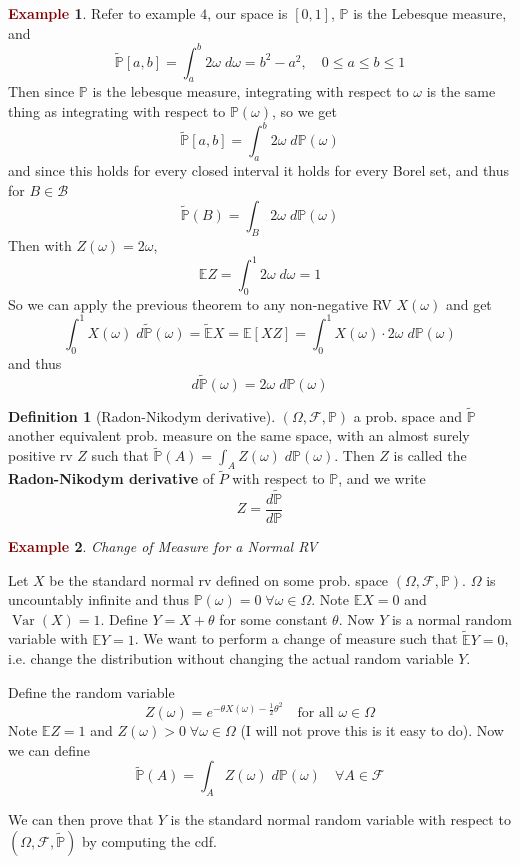 \documentclass[11pt]{article}
\theoremstyle{definition}
\theoremstyle{definition}
\theoremstyle{definition}
\newtheorem{definition}{\textcolor{OliveGreen}{Definition}}
\newtheorem{ex}{\textcolor{Maroon}{Example}}
\theoremstyle{remark}
\begin{document}
\begin{ex}
    Refer to example $4$, our space is $[0, 1]$, $\mathbb{P}$ is the Lebesque measure, and  
    \[
        \tilde{\mathbb{P}}[a,b] = \int_a^b 2 \omega \; d \omega = b^2 - a^2, \quad 0 \leq a \leq b \leq 1
    \] 
    Then since $\mathbb{P}$ is the lebesque measure, integrating with respect to $\omega$ is the same thing as 
    integrating with respect to $\mathbb{P}(\omega)$, so we get
    \[
        \tilde{\mathbb{P}}[a, b] = \int_a^b 2 \omega \; d\mathbb{P}(\omega)
    \]   
    and since this holds for every closed interval it holds for every Borel set, and thus for $B \in \mathcal{B}$ 
    \[
        \tilde{\mathbb{P}}(B) = \int_B 2 \omega \; d\mathbb{P}(\omega)
    \] 
    Then with $Z(\omega) = 2 \omega$, 
    \[
        \mathbb{E} Z = \int_0^1 2 \omega \; d \omega = 1
    \] 
    So we can apply the previous theorem to any non-negative RV $X(\omega)$ and get
    \[
        \int_0^1 X(\omega) \; d \tilde{\mathbb{P}}(\omega) = \tilde{\mathbb{E}} X = \mathbb{E} [XZ] = \int_0^1 X(\omega) \cdot 2 \omega \; d\mathbb{P}(\omega)
    \] 
    and thus
    \[
        d\tilde{\mathbb{P}}(\omega) = 2 \omega \; d \mathbb{P}(\omega)
    \] 
\end{ex}

\begin{definition}[Radon-Nikodym derivative]
    $(\Omega, \mathcal{F}, \mathbb{P})$ a prob. space and $\tilde{\mathbb{P}}$ another equivalent prob. measure
    on the same space, with an almost surely positive rv $Z$ such that $\tilde{\mathbb{P}}(A) = \int_A Z(\omega) \; d \mathbb{P}(\omega)$.
    Then $Z$ is called the \textbf{Radon-Nikodym derivative} of $\tilde{P}$ with respect to $\mathbb{P}$, and we write
    \[
        Z = \frac{d \tilde{\mathbb{P}}}{d\mathbb{P}}
    \]       
\end{definition}

\begin{ex}\textit{Change of Measure for a Normal RV}
    
    Let $X$ be the standard normal rv defined on some prob. space $(\Omega, \mathcal{F}, \mathbb{P})$.
    $\Omega$ is uncountably infinite and thus $\mathbb{P}(\omega) = 0 \; \forall \omega \in \Omega$.
    Note $\mathbb{E} X = 0 $ and $\operatorname{Var}(X) = 1$. Define $Y = X + \theta$ for some constant
    $\theta$. Now $Y$ is a normal random variable with $\mathbb{E} Y = 1$. We want to perform a change
    of measure such that $\tilde{\mathbb{E}} Y = 0$, i.e. change the distribution without changing the 
    actual random variable $Y$.
    
    Define the random variable
    \[
        Z(\omega) = e^{-\theta X(\omega) - \frac{1}{2} \theta^2} \quad \text{for all } \omega \in \Omega
    \] 
    Note $\mathbb{E} Z = 1$ and $Z(\omega) > 0 \; \forall \omega \in \Omega$ (I will not prove this is it easy to do).
    Now we can define
    \[
        \tilde{\mathbb{P}}(A) = \int_A Z(\omega) \; d \mathbb{P}(\omega) \quad \forall A \in \mathcal{F}
    \] 

    We can then prove that $Y$ is the standard normal random variable with respect to $(\Omega, \mathcal{F}, \tilde{\mathbb{P}})$
    by computing the cdf. 
\end{ex}
\end{document}
